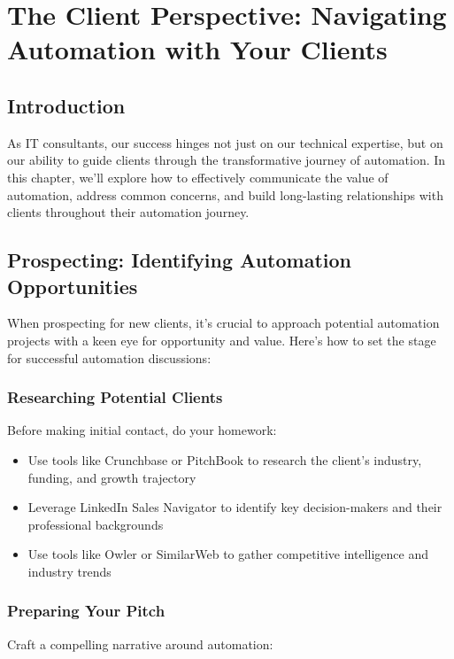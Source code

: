\chapter{The Client Perspective: Navigating Automation with Your Clients}


\section{Introduction}

As IT consultants, our success hinges not just on our technical expertise, but on our ability to guide clients through the transformative journey of automation. In this chapter, we'll explore how to effectively communicate the value of automation, address common concerns, and build long-lasting relationships with clients throughout their automation journey.


\section{Prospecting: Identifying Automation Opportunities}

When prospecting for new clients, it's crucial to approach potential automation projects with a keen eye for opportunity and value. Here's how to set the stage for successful automation discussions:

\subsection{Researching Potential Clients}

Before making initial contact, do your homework:

\begin{itemize}
    \item Use tools like Crunchbase or PitchBook to research the client's industry, funding, and growth trajectory
    \item Leverage LinkedIn Sales Navigator to identify key decision-makers and their professional backgrounds
    \item Use tools like Owler or SimilarWeb to gather competitive intelligence and industry trends
\end{itemize}

\subsection{Preparing Your Pitch}

Craft a compelling narrative around automation:

